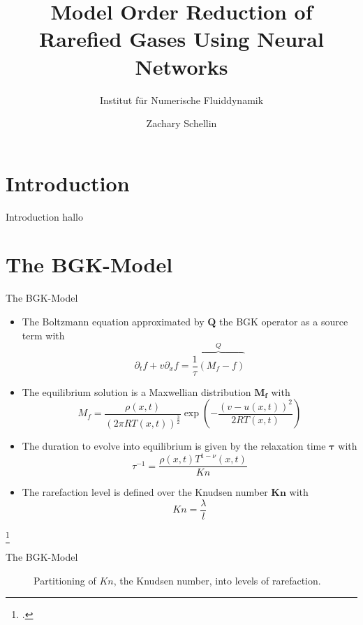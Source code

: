 \documentclass[Nike]{tuberlinbeamer}
\title{Model Order Reduction of Rarefied Gases Using Neural Networks}
\subtitle{Institut f\"ur Numerische Fluiddynamik}
\author[Zachary Schellin]{Zachary Schellin}
\institute{Technische Universität Berlin}
\begin{document}
\begin{frame}
\maketitle
\end{frame}


\begin{frame}
\tableofcontents
\end{frame}
\section{Introduction}
\begin{frame}[fragile]{Introduction}
 hallo
\end{frame}
\section{The BGK-Model}
\begin{frame}[fragile]{The BGK-Model}
	\begin{itemize}
		\item The Boltzmann equation approximated by $\boldsymbol{Q}$ the BGK operator as a source term with
		\begin{equation}
		\partial_t f + v \partial_x f = \overbrace{\frac{1}{\tau} (M_f - f)}^{Q}
		\end{equation}

		\item The equilibrium solution is a Maxwellian distribution $\boldsymbol{M_f}$ with
		\begin{equation}
		M_f = \frac{\rho(x,t)}{(2\pi R T(x,t))^{\frac{3}{2}}}\exp(-\frac{(v - u(x,t))^2}{2 R T(x,t)}) 
		\end{equation}

		\item The duration to evolve into equilibrium is given by the relaxation time $\boldsymbol{\tau}$ with
		\begin{equation}
		\tau^{-1} = \frac{\rho(x,t)T^{1-\nu}(x,t)}{Kn}
		\end{equation}

		\item The rarefaction level is defined over the Knudsen number $\boldsymbol{Kn}$ with
		\begin{equation}
		Kn = \frac{\lambda}{l}
		\end{equation}
	\end{itemize}
\footcite{PhysRev.94.511}
\end{frame}
\begin{frame}[fragile]{The BGK-Model}
		\begin{figure}[H]
		
		\caption{Partitioning of $Kn$, the Knudsen number, into levels of rarefaction.}
		\label{Fig:ExpKN}
	\end{figure}
\end{frame}
\end{document}
